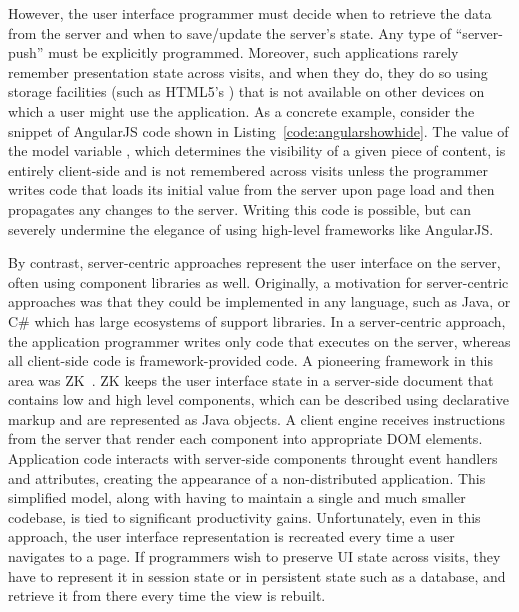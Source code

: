 
However, the user interface programmer must decide when to retrieve the data
from the server and when to save/update the server's state.  Any type of ``server-push''
must be explicitly programmed.  Moreover, such applications
rarely remember presentation state across visits, and when they do, they do so 
using storage facilities (such as HTML5's ) that is not 
available on other devices on which a user might use the application.
As a concrete example, consider the snippet of AngularJS code shown in
Listing~\ref{code:angularshowhide}. The value of the model variable ,
which determines the visibility of a given piece of content, is entirely
client-side and is not remembered across visits unless the programmer writes
code that loads its initial value from the server upon page load and then 
propagates any changes to the server.  Writing this code is possible, but can 
severely undermine the elegance of using high-level frameworks like AngularJS.

By contrast, server-centric approaches represent the user interface on
the server, often using component libraries as well.  Originally, a motivation
for server-centric approaches was that they could be implemented in any language,
such as Java, or C\# which has large ecosystems of support libraries.
In a server-centric approach, the application programmer writes only code
that executes on the server, whereas all client-side code is framework-provided
code.  A pioneering framework in this area was ZK~\cite{ChenCheng:book2007}.
ZK keeps the user interface state in a server-side document that contains
low and high level components, which can be described using declarative
markup and are represented as Java objects.
A client engine receives instructions from the server that render each 
component into appropriate DOM elements.  Application code interacts
with server-side components throught event handlers and attributes, 
creating the appearance of a non-distributed application.  This simplified
model, along with having to maintain a single and much smaller codebase,
is tied to significant productivity gains.
Unfortunately, even in this approach, the user interface representation 
is recreated every time a user navigates to a page.  If programmers wish to
preserve UI state across visits, they have to represent it in session state
or in persistent state such as a database, and retrieve it from there every 
time the view is rebuilt.

